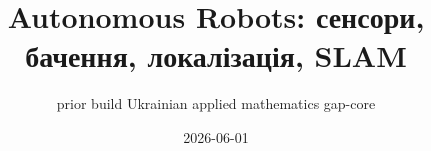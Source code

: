 \documentclass[11pt,a4paper,oneside]{book}
\begin{document}
\pagestyle{plain}
\title{Autonomous Robots: сенсори, бачення, локалізація, SLAM}
\author{prior build Ukrainian applied mathematics gap-core}
\date{2026-06-01}
\maketitle
\tableofcontents

\end{document}
